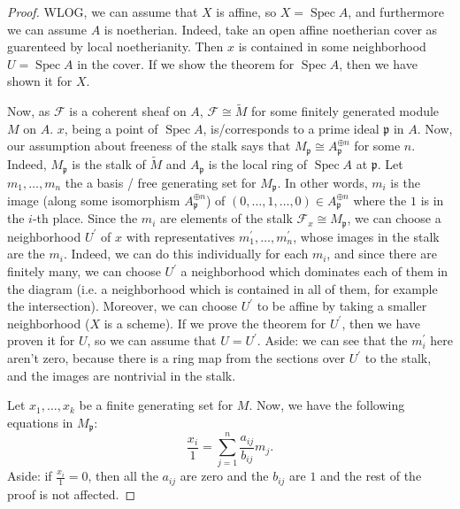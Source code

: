 \documentclass[a4paper]{article}
\newcommand{\isom}{\cong}
\newcommand{\Spec}{\operatorname{Spec}}
\begin{document}
\begin{proof}
	WLOG, we can assume that \(X\) is affine, so 
	\(X = \Spec A\), and furthermore we can assume
	\(A\) is noetherian.
	Indeed, take an open affine noetherian cover 
	as guarenteed by local noetherianity. 
	Then \(x\) is contained in some neighborhood
	\(U = \Spec A\) in the cover. 
	If we show the theorem for \(\Spec A\),
	then we have shown it for \(X\).

	Now, as \(\mathcal{F}\) is a coherent sheaf on 
	\(A\), \(\mathcal{F} \isom \tilde{M}\) for some
	finitely generated module \(M\) on \(A\).
	\(x\), being a point of \(\Spec A\), 
	is/corresponds to a prime
	ideal \(\mathfrak{p}\) in \(A\).
	Now, our assumption about
	freeness of the stalk says that
	\(M_{\mathfrak{p}} \isom A_{\mathfrak{p}}^{\oplus n}\) 
	for some \(n\).
	Indeed, \(M_{\mathfrak{p}}\) is the stalk of 
	\(\tilde{M}\) and \(A_{\mathfrak{p}}\) is the local
	ring of \(\Spec A\) at \(\mathfrak{p}\).
	Let \(m_{1} , \ldots , m_{n}\) the a 
	basis / free generating set for \(M_{\mathfrak{p}}\).
	In other words, \(m_{i}\) is the image 
	(along
	some isomorphism \(A_{\mathfrak{p}}^{\oplus n}\)) of
	\((0, \ldots, 1, \ldots, 0) \in A_{\mathfrak{p}}^{\oplus n}\)
	where the \(1\) is in the \(i\)-th place.
	Since the \(m_{i}\) are elements of the stalk 
	\(\mathcal{F}_{x} \isom M_{\mathfrak{p}}\),
	we can choose a neighborhood \(U^{\prime}\) of \(x\) with 
	representatives \(m_{1}^{\prime}, \ldots, m_{n}^{\prime}\),
	whose images in the stalk are the \(m_{i}\).
	Indeed, we can do this individually for each \(m_{i}\),
	and since there are finitely many, 
	we can choose \(U^{\prime}\) a neighborhood which dominates each of them in 
	the diagram (i.e. a neighborhood which is contained in
	all of them, for example the intersection).
	Moreover, we can choose \(U^{\prime}\) to be affine by taking a 
	smaller neighborhood (\(X\) is a scheme).
	If we prove the theorem for \(U^{\prime}\), then we 
	have proven it for \(U\),
	so we can assume that \(U = U^{\prime}\).
	Aside: we can see that the \(m_{i}^{\prime}\) here aren't
	zero, because there is a ring map from the sections over
	\(U^{\prime}\) to the stalk, and the images are nontrivial in the stalk.


	Let \(x_{1}, \ldots, x_{k}\) be a finite generating set
	for \(M\).
	Now, we have the following equations in \(M_{\mathfrak{p}}\):
	\[
		\frac{x_{i}}{1} = \sum_{j=1}^{n} \frac{a_{ij}}{b_{ij}} m_{j} 
	.\] 
	Aside: if \(\frac{x_{i}}{1} = 0\), then all the \(a_{ij}\) are zero
	and the \(b_{ij}\) are \(1\) and the rest of the proof is
	not affected.


\end{proof}
\end{document}

